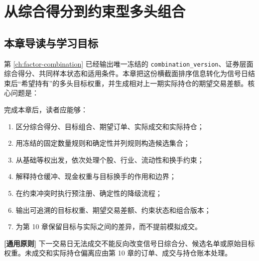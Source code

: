 \chapter{从综合得分到约束型多头组合}
\label{ch:portfolio}

\section{本章导读与学习目标}

第 \cref{ch:factor-combination} 已经输出唯一冻结的 \texttt{combination\_version}、证券层面综合得分、共同样本状态和适用条件。本章把这份横截面排序信息转化为信号日结束后“希望持有”的多头目标权重，并生成相对上一期实际持仓的期望交易差额。核心问题是：

完成本章后，读者应能够：

\begin{enumerate}
  \item 区分综合得分、目标组合、期望订单、实际成交和实际持仓；
  \item 用冻结的固定数量规则和确定性并列规则构造候选集合；
  \item 从基础等权出发，依次处理个股、行业、流动性和换手约束；
  \item 解释持仓缓冲、现金权重与目标换手的作用和边界；
  \item 在约束冲突时执行预注册、确定性的降级流程；
  \item 输出可追溯的目标权重、期望交易差额、约束状态和组合版本；
  \item 为第 10 章保留目标与实际之间的差异，而不提前模拟成交。
\end{enumerate}

\begin{principlebox}
\textbf{[通用原则]} 下一交易日无法成交不能反向改变信号日综合分、候选名单或原始目标权重。未成交和实际持仓偏离应由第 10 章的订单、成交与持仓账本处理。
\end{principlebox}

